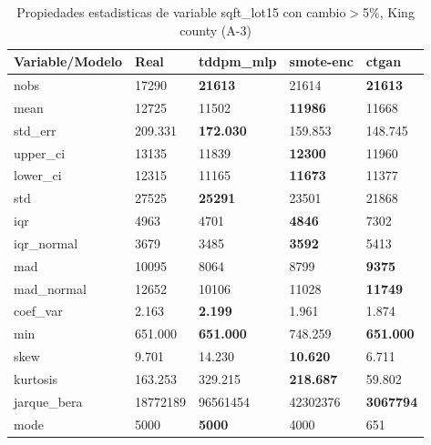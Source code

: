\begin{table}[H]
\centering
\fontsize{8}{14}\selectfont
\caption{Propiedades estadisticas de variable sqft\_lot15 con cambio\ensuremath{>}5\%, King county (A-3)}
\label{table-stats-king county-a-3-sqft_lot15-short}
\begin{tabular}{|l|m{10em}|m{10em}|m{10em}|m{10em}|}
\hline
 \rowcolor[gray]{0.8}
Variable/Modelo & Real & tddpm\_mlp & smote-enc & ctgan \\
\hline nobs & 17290 & \bfseries 21613 & \cellcolor[rgb]{0.9, 0.54, 0.52} 21614 & \bfseries 21613 \\
\hline mean & 12725 & \cellcolor[rgb]{0.9, 0.54, 0.52} 11502 & \bfseries 11986 & 11668 \\
\hline std\_err & 209.331 & \bfseries 172.030 & 159.853 & \cellcolor[rgb]{0.9, 0.54, 0.52} 148.745 \\
\hline upper\_ci & 13135 & \cellcolor[rgb]{0.9, 0.54, 0.52} 11839 & \bfseries 12300 & 11960 \\
\hline lower\_ci & 12315 & \cellcolor[rgb]{0.9, 0.54, 0.52} 11165 & \bfseries 11673 & 11377 \\
\hline std & 27525 & \bfseries 25291 & 23501 & \cellcolor[rgb]{0.9, 0.54, 0.52} 21868 \\
\hline iqr & 4963 & 4701 & \bfseries 4846 & \cellcolor[rgb]{0.9, 0.54, 0.52} 7302 \\
\hline iqr\_normal & 3679 & 3485 & \bfseries 3592 & \cellcolor[rgb]{0.9, 0.54, 0.52} 5413 \\
\hline mad & 10095 & \cellcolor[rgb]{0.9, 0.54, 0.52} 8064 & 8799 & \bfseries 9375 \\
\hline mad\_normal & 12652 & \cellcolor[rgb]{0.9, 0.54, 0.52} 10106 & 11028 & \bfseries 11749 \\
\hline coef\_var & 2.163 & \bfseries 2.199 & 1.961 & \cellcolor[rgb]{0.9, 0.54, 0.52} 1.874 \\
\hline min & 651.000 & \bfseries 651.000 & \cellcolor[rgb]{0.9, 0.54, 0.52} 748.259 & \bfseries 651.000 \\
\hline skew & 9.701 & \cellcolor[rgb]{0.9, 0.54, 0.52} 14.230 & \bfseries 10.620 & 6.711 \\
\hline kurtosis & 163.253 & \cellcolor[rgb]{0.9, 0.54, 0.52} 329.215 & \bfseries 218.687 & 59.802 \\
\hline jarque\_bera & 18772189 & \cellcolor[rgb]{0.9, 0.54, 0.52} 96561454 & 42302376 & \bfseries 3067794 \\
\hline mode & 5000 & \bfseries 5000 & 4000 & \cellcolor[rgb]{0.9, 0.54, 0.52} 651 \\

\end{tabular}
\end{table}
